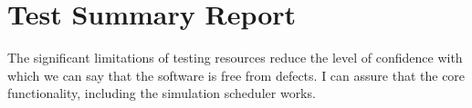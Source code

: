 \documentclass[11pt]{article}
\begin{document}
\section{Test Summary Report}%

The significant limitations of testing resources reduce the level of confidence with which we can say that the software is free from defects. I can assure that the core functionality, including the simulation scheduler works.





\end{document}
